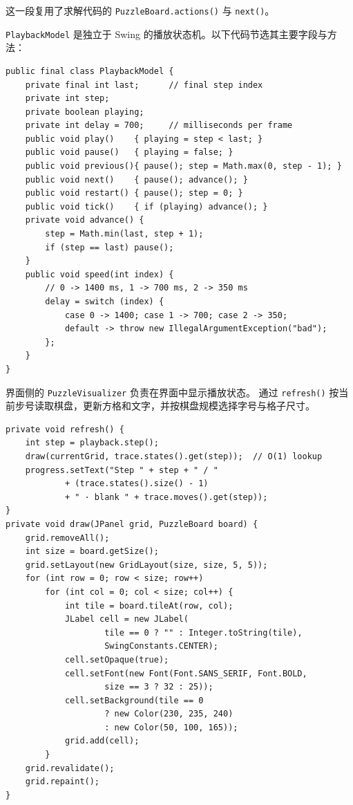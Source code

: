 这一段复用了求解代码的 \texttt{PuzzleBoard.actions()} 与 \texttt{next()}。

\par\vspace{2bp}

\texttt{PlaybackModel} 是独立于 Swing 的播放状态机。以下代码节选其主要字段与方法：

{\fontsize{9.5bp}{12bp}\selectfont
\noindent\begin{minipage}{\linewidth}
\begin{verbatim}
public final class PlaybackModel {
    private final int last;      // final step index
    private int step;
    private boolean playing;
    private int delay = 700;     // milliseconds per frame
    public void play()    { playing = step < last; }
    public void pause()   { playing = false; }
    public void previous(){ pause(); step = Math.max(0, step - 1); }
    public void next()    { pause(); advance(); }
    public void restart() { pause(); step = 0; }
    public void tick()    { if (playing) advance(); }
    private void advance() {
        step = Math.min(last, step + 1);
        if (step == last) pause();
    }
    public void speed(int index) {
        // 0 -> 1400 ms, 1 -> 700 ms, 2 -> 350 ms
        delay = switch (index) {
            case 0 -> 1400; case 1 -> 700; case 2 -> 350;
            default -> throw new IllegalArgumentException("bad");
        };
    }
}
\end{verbatim}
\end{minipage}}

界面侧的 \texttt{PuzzleVisualizer} 负责在界面中显示播放状态。
通过 \texttt{refresh()} 按当前步号读取棋盘，更新方格和文字，并按棋盘规模选择字号与格子尺寸。

{\fontsize{9.5bp}{12bp}\selectfont
\noindent\begin{minipage}{\linewidth}
\begin{verbatim}
private void refresh() {
    int step = playback.step();
    draw(currentGrid, trace.states().get(step));  // O(1) lookup
    progress.setText("Step " + step + " / "
            + (trace.states().size() - 1)
            + " · blank " + trace.moves().get(step));
}
private void draw(JPanel grid, PuzzleBoard board) {
    grid.removeAll();
    int size = board.getSize();
    grid.setLayout(new GridLayout(size, size, 5, 5));
    for (int row = 0; row < size; row++)
        for (int col = 0; col < size; col++) {
            int tile = board.tileAt(row, col);
            JLabel cell = new JLabel(
                    tile == 0 ? "" : Integer.toString(tile),
                    SwingConstants.CENTER);
            cell.setOpaque(true);
            cell.setFont(new Font(Font.SANS_SERIF, Font.BOLD,
                    size == 3 ? 32 : 25));
            cell.setBackground(tile == 0
                    ? new Color(230, 235, 240)
                    : new Color(50, 100, 165));
            grid.add(cell);
        }
    grid.revalidate();
    grid.repaint();
}
\end{verbatim}
\end{minipage}}


